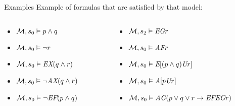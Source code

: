 \begin{frame}{Examples}
    Example of formulas that are satisfied by that model:
    
    \begin{columns}[c]
        \begin{column}{.4\textwidth}
            \begin{itemize}
                \item $\mathcal{M}, s_0 \vDash p \land q$
                \item $\mathcal{M}, s_0 \vDash \neg r$
                \item $\mathcal{M}, s_0 \vDash \textit{E}\textit{X}(q\land r)$
                \item $\mathcal{M}, s_0 \vDash \neg \textit{A}\textit{X}(q\land r)$
                \item $\mathcal{M}, s_0 \vDash \neg \textit{E}\textit{F}(p\land q)$
            \end{itemize}
            \end{column}
        \begin{column}{.6\textwidth}
            \begin{itemize}
                \item $\mathcal{M}, s_2 \vDash \textit{E}\textit{G} r$
                \item $\mathcal{M}, s_0 \vDash \textit{A}\textit{F} r$
                \item $\mathcal{M}, s_0 \vDash \textit{E}[(p\land q) \textit{U} r]$
                \item $\mathcal{M}, s_0 \vDash \textit{A}[p \textit{U} r]$
                \item $\mathcal{M}, s_0 \vDash \textit{A}\textit{G}(p \lor q \lor r \to \textit{E}\textit{F}\textit{E}\textit{G} r)$ 
            \end{itemize}
            
        \end{column}
        
        
    \end{columns}
    
\end{frame}
